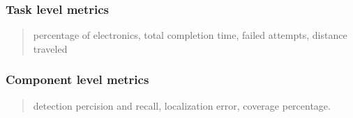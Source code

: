 \begin{paracol}
\subsubsection{Task level metrics}

\begin{quote}
percentage of electronics, total completion time, failed attempts, distance traveled
\end{quote}

\subsubsection{Component level metrics}

\begin{quote}
detection percision and recall, localization error, coverage percentage.
\end{quote}
\end{paracol}